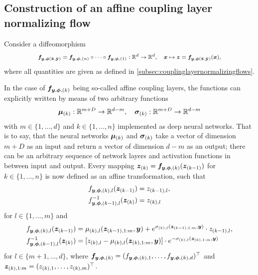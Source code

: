 \documentclass[a4paper,12pt]{report}
\begin{document}
\subsection{Construction of an affine coupling layer normalizing flow}
Consider a diffeomorphism \begin{align}\footnotesize \begin{aligned}
\bm{f}_{\bm{y},\bm{\phi}(\hat{\boldsymbol{\mathbf{x}}},\hat{\boldsymbol{\mathbf{y}}})} = \bm{f}_{\bm{y},\bm{\phi},(n)}\circ \dots \circ \bm{f}_{\bm{y},\bm{\phi},(1)}: \mathbb{R}^d \rightarrow \mathbb{R}^d, \quad \bm{x} \mapsto \bm{z} = \bm{f}_{\bm{y},\bm{\phi}(\hat{\boldsymbol{\mathbf{x}}},\hat{\boldsymbol{\mathbf{y}}})}(\bm{x}),
\end{aligned}\end{align} where all quantities are given as defined in \cref{subsec:couplinglayernormalizingflows}. 

In the case of $\bm{f}_{\bm{y},\bm{\phi},(k)}$ being so-called affine coupling layers, the functions can explicitly written by means of two arbitrary functions \begin{equation}
\bm{\mu}_{(k)}: \mathbb{R}^{m+D} \rightarrow \mathbb{R}^{d-m}, \quad \bm{\sigma}_{(k)}: \mathbb{R}^{m+D} \rightarrow \mathbb{R}^{d-m}
\end{equation} with $m \in \{1,\dots,d\}$ and $k \in \{1,\dots,n\}$ implemented as deep neural networks. That is to say, that the neural networks $\bm{\mu}_{(k)}$ and $\bm{\sigma}_{(k)}$ take a vector of dimension $m+D$ as an input and return a vector of dimension $d-m$ as an output; there can be an arbitrary sequence of network layers and activation functions in between input and output. Every mapping $\bm{z}_{(k)} = \bm{f}_{\bm{y},\bm{\phi},(k)}(\bm{z}_{(k-1)})$ for $k \in \{1,\dots,n\}$ is now defined as an affine transformation, such that \begin{align}
f_{\bm{y},\bm{\phi},(k),l}(\bm{z}_{(k-1)}) &= z_{(k-1),l}, \\
f_{\bm{y},\bm{\phi},(k-1),l}^{-1}(\bm{z}_{(k)}) &= 
z_{(k),l}
\end{align} for $l \in \{1,\dots,m\}$
and
\begin{align}
f_{\bm{y},\bm{\phi},(k),l}(\bm{z}_{(k-1)}) &= 
\mu_{(k),l}(\bm{z}_{(k-1),1:m},\bm{y}) + e^{\sigma_{(k),l}(\bm{z}_{(k-1),1:m},\bm{y})}\cdot z_{(k-1),l}, \\
f_{\bm{y},\bm{\phi},(k-1),l}^{-1}(\bm{z}_{(k)}) &= [z_{(k),l} - \mu_{(k),l}(\bm{z}_{(k),1:m},\bm{y})]\cdot  e^{-\sigma_{(k),l}(\bm{z}_{(k),1:m},\bm{y})}
\end{align} for $l \in \{m+1,\dots,d\}$, where $\bm{f}_{\bm{y},\bm{\phi},(k)} = (f_{\bm{y},\bm{\phi},(k),1},\dots,f_{\bm{y},\bm{\phi},(k),d})^\top$ and $\bm{z}_{(k),1:m} = (z_{(k),1},\dots, z_{(k),m})^\top$.
\end{document}
